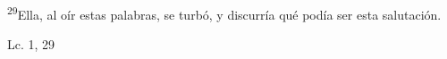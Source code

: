 \documentclass[../../rosario.tex]{subfiles}
\begin{document}
    \textsuperscript{29}Ella, al oír estas palabras, se turbó, y discurría qué podía ser esta salutación.
    \begin{flushright}
    Lc. 1, 29
    \end{flushright}
\end{document}
